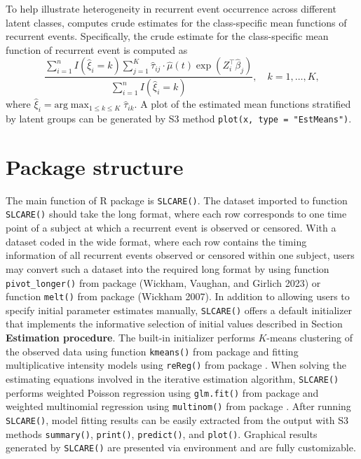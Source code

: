 To help illustrate heterogeneity in recurrent event occurrence across different latent classes,
 computes crude estimates for the class-specific mean functions of recurrent events. Specifically, the crude estimate for the class-specific mean function of recurrent event is computed as
\begin{equation} 
\label{eq:17}
\frac{ \sum _{i = 1} ^{n} I(\hat{\xi} _i = k) \sum _{j = 1} ^{K} \hat{\tau} _{ij} \cdot \hat{\mu}(t) \exp (Z_i ^{\top} \hat{\beta} _j) }{ \sum _{i = 1} ^{n} I (\hat{\xi} _i = k)}, \quad k = 1, \dots, K,
\end{equation}
where
\(\hat{\xi} _i = \text{arg} \max _{1 \le k \le K} \hat{\tau} _{ik}\).
A plot of the estimated mean functions stratified by
latent groups can be generated by S3 method \texttt{plot(x,\ type\ =\ "EstMeans")}.

\hypertarget{package-structure}{%
\section{Package structure}\label{package-structure}}

The main function of R package  is \texttt{SLCARE()}. The dataset imported to function \texttt{SLCARE()} should take the long format, where each row corresponds to one time point of a subject at which a recurrent event is observed or censored. With a dataset coded in the wide format, where each row contains the timing information of all recurrent events observed or censored within one subject, users may convert such a dataset into the required long format by using function \texttt{pivot\_longer()} from package  (Wickham, Vaughan, and Girlich 2023) or function \texttt{melt()} from package  (Wickham 2007). In addition to allowing users to specify initial parameter estimates manually,
\texttt{SLCARE()} offers a default initializer that implements the informative selection of initial values described in Section \textbf{Estimation procedure}.
The built-in initializer performs \(K\)-means clustering of the observed data using function \texttt{kmeans()} from package
 and fitting multiplicative intensity models using \texttt{reReg()} from package .
When solving the estimating equations involved in the iterative estimation algorithm,
\texttt{SLCARE()} performs weighted Poisson regression using
\texttt{glm.fit()} from package  and weighted multinomial regression using \texttt{multinom()} from package .
After running \texttt{SLCARE()}, model fitting results can be
easily extracted from the output with S3 methods \texttt{summary()}, \texttt{print()}, \texttt{predict()}, and \texttt{plot()}.
Graphical results generated by \texttt{SLCARE()} are presented via  environment and are fully customizable.

